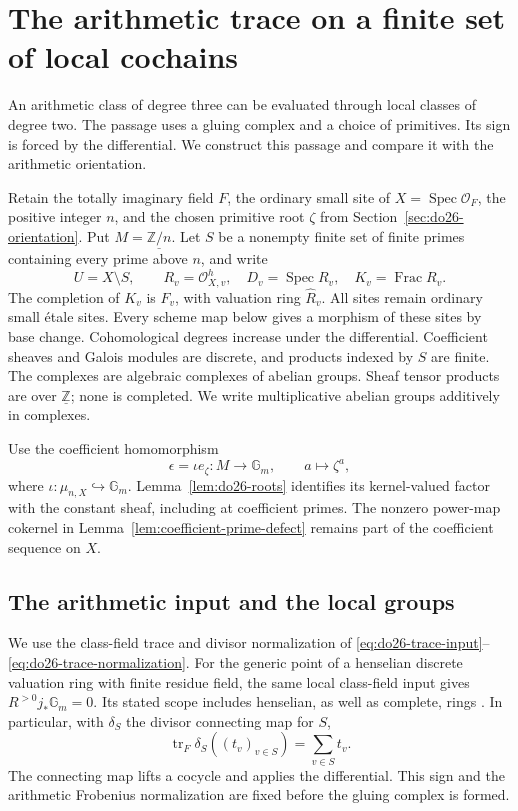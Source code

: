 \section{The arithmetic trace on a finite set of local cochains}
\label{sec:do27-trace}

An arithmetic class of degree three can be evaluated through local
classes of degree two. The passage uses a gluing complex and a choice
of primitives. Its sign is forced by the differential. We construct
this passage and compare it with the arithmetic orientation.

Retain the totally imaginary field \(F\), the ordinary small site of
\(X=\operatorname{Spec}\mathcal O_F\), the positive integer \(n\),
and the chosen primitive root \(\zeta\) from
Section~\ref{sec:do26-orientation}. Put \(M=\underline{\mathbb Z/n}\).
Let \(S\) be a nonempty finite set of finite primes containing every
prime above \(n\), and write
\[
 U=X\setminus S,\qquad
 R_v=\mathcal O_{X,v}^{h},\quad D_v=\operatorname{Spec}R_v,
 \quad K_v=\operatorname{Frac}R_v.
\]
The completion of \(K_v\) is \(F_v\), with valuation ring
\(\widehat R_v\). All sites remain ordinary small \'etale sites.
Every scheme map below gives a morphism of these sites by base change.
Cohomological degrees increase under the differential. Coefficient
sheaves and Galois modules are discrete, and products indexed by \(S\)
are finite. The complexes are algebraic complexes of abelian groups.
Sheaf tensor products are over \(\underline{\mathbb Z}\); none is
completed. We write multiplicative abelian groups additively in complexes.

Use the coefficient homomorphism
\[
 \epsilon=\iota e_\zeta:M\longrightarrow\mathbb G_m,
 \qquad a\longmapsto\zeta^a,
\]
where \(\iota:\mu_{n,X}\hookrightarrow\mathbb G_m\).
Lemma~\ref{lem:do26-roots} identifies its kernel-valued factor with
the constant sheaf, including at coefficient primes. The nonzero
power-map cokernel in Lemma~\ref{lem:coefficient-prime-defect} remains
part of the coefficient sequence on \(X\).

\subsection{The arithmetic input and the local groups}

We use the class-field trace and divisor normalization of
\eqref{eq:do26-trace-input}--\eqref{eq:do26-trace-normalization}.
For the generic point of a henselian discrete valuation ring with finite
residue field, the same local class-field input gives
\(R^{>0}j_*\mathbb G_m=0\).
Its stated scope includes henselian, as well as complete, rings
\cite[\S1, (1.1), p.~525]{Mazur1973}. In particular, with
\(\delta_S\) the divisor connecting map for \(S\),
\begin{equation}
\label{eq:do27-input}
 \operatorname{tr}_F\delta_S((t_v)_{v\in S})=\sum_{v\in S}t_v.
\end{equation}
The connecting map lifts a cocycle and applies the differential.
This sign and the arithmetic Frobenius normalization are fixed before
the gluing complex is formed.

